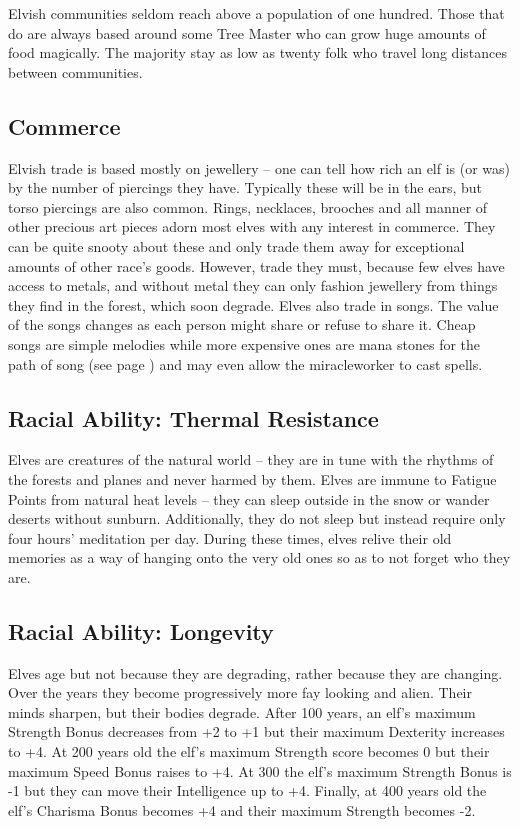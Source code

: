 \begin{multicols}{2}
Elvish communities seldom reach above a population of one hundred.
Those that do are always based around some Tree Master who can grow huge amounts of food magically.
The majority stay as low as twenty folk who travel long distances between communities.

\subsection{Commerce}

Elvish trade is based mostly on jewellery -- one can tell how rich an elf is (or was) by the number of piercings they have.
Typically these will be in the ears, but torso piercings are also common.
Rings, necklaces, brooches and all manner of other precious art pieces adorn most elves with any interest in commerce.
They can be quite snooty about these and only trade them away for exceptional amounts of other race's goods.
However, trade they must, because few elves have access to metals, and without metal they can only fashion jewellery from things they find in the forest, which soon degrade.
Elves also trade in songs.
The value of the songs changes as each person might share or refuse to share it.
Cheap songs are simple melodies while more expensive ones are mana stones for the path of song (see page \pageref{song}) and may even allow the \gls{miracleworker} to cast spells.

\subsection{Racial Ability: Thermal Resistance}

Elves are creatures of the natural world -- they are in tune with the rhythms of the forests and planes and never harmed by them. Elves are immune to Fatigue Points from natural heat levels -- they can sleep outside in the snow or wander deserts without sunburn. Additionally, they do not sleep but instead require only four hours' meditation per day. During these times, elves relive their old memories as a way of hanging onto the very old ones so as to not forget who they are.

\subsection{Racial Ability: Longevity}

Elves age but not because they are degrading, rather because they are changing.
Over the years they become progressively more fay looking and alien.
Their minds sharpen, but their bodies degrade.
After 100 years, an elf's maximum Strength Bonus decreases from +2 to +1 but their maximum Dexterity increases to +4.
At 200 years old the elf's maximum Strength score becomes 0 but their maximum Speed Bonus raises to +4.
At 300 the elf's maximum Strength Bonus is -1 but they can move their Intelligence up to +4.
Finally, at 400 years old the elf's Charisma Bonus becomes +4 and their maximum Strength becomes -2.


\end{multicols}
